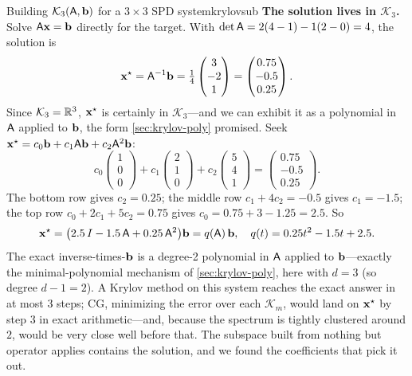 \begin{workedexample}{Building $\mathcal{K}_3(\mathsf{A},\mathbf{b})$ for a $3\times3$ SPD
system}{krylovsub}
\textbf{The solution lives in $\mathcal{K}_3$.} Solve $\mathsf{A}\mathbf{x}=\mathbf{b}$ directly for the
target. With $\det\mathsf{A}=2(4-1)-1(2-0)=4$, the solution is
\[
  \mathbf{x}^\star=\mathsf{A}^{-1}\mathbf{b}=\tfrac14\begin{pmatrix}3\\-2\\1\end{pmatrix}
   =\begin{pmatrix}0.75\\-0.5\\0.25\end{pmatrix}.
\]
Since $\mathcal{K}_3=\mathbb{R}^3$, $\mathbf{x}^\star$ is certainly in $\mathcal{K}_3$---and we can
exhibit it as a polynomial in $\mathsf{A}$ applied to $\mathbf{b}$, the form
\cref{sec:krylov-poly} promised. Seek $\mathbf{x}^\star=c_0\mathbf{b}+c_1\mathsf{A}\mathbf{b}+c_2\mathsf{A}^2\mathbf{b}$:
\[
  c_0\begin{pmatrix}1\\0\\0\end{pmatrix}
  +c_1\begin{pmatrix}2\\1\\0\end{pmatrix}
  +c_2\begin{pmatrix}5\\4\\1\end{pmatrix}
  =\begin{pmatrix}0.75\\-0.5\\0.25\end{pmatrix}.
\]
The bottom row gives $c_2=0.25$; the middle row $c_1+4c_2=-0.5$ gives $c_1=-1.5$; the
top row $c_0+2c_1+5c_2=0.75$ gives $c_0=0.75+3-1.25=2.5$. So
\[
  \mathbf{x}^\star=\bigl(2.5\,I-1.5\,\mathsf{A}+0.25\,\mathsf{A}^2\bigr)\mathbf{b}
  = q(\mathsf{A})\,\mathbf{b},\quad q(t)=0.25t^2-1.5t+2.5 .
\]
The exact inverse-times-$\mathbf{b}$ is a degree-2 polynomial in $\mathsf{A}$ applied to
$\mathbf{b}$---exactly the minimal-polynomial mechanism of \cref{sec:krylov-poly}, here with
$d=3$ (so degree $d-1=2$). A Krylov method on this system reaches the exact answer in
at most $3$ steps; CG, minimizing the error over each $\mathcal{K}_m$, would land on
$\mathbf{x}^\star$ by step $3$ in exact arithmetic---and, because the spectrum is tightly
clustered around $2$, would be very close well before that. The subspace built from
nothing but operator applies contains the solution, and we found the coefficients
that pick it out.
\end{workedexample}

